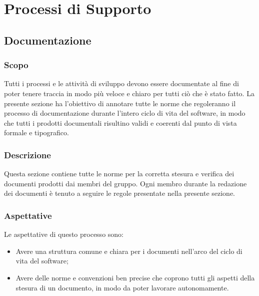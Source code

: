 \chapter{Processi di Supporto}

\section{Documentazione}
\subsection{Scopo}
Tutti i processi e le attività di sviluppo devono essere documentate al fine di poter tenere traccia in modo più veloce e chiaro per tutti ciò che è stato fatto. La presente sezione ha l'obiettivo di annotare tutte le norme che regoleranno il processo di documentazione durante l'intero ciclo di vita del software, in modo che tutti i prodotti documentali risultino validi e coerenti dal punto di vista formale e tipografico.
\subsection{Descrizione}
Questa sezione contiene tutte le norme per la corretta stesura e verifica dei documenti prodotti dai membri del gruppo. Ogni membro durante la redazione dei documenti è tenuto a seguire le regole presentate nella presente sezione.
\subsection{Aspettative}
Le aspettative di questo processo sono:
\begin{itemize}
    \item Avere una struttura comune e chiara per i documenti nell'arco del ciclo di vita del software;
    \item Avere delle norme e convenzioni ben precise che coprono tutti gli aspetti della stesura di un
documento, in modo da poter lavorare autonomamente.
\end{itemize}
